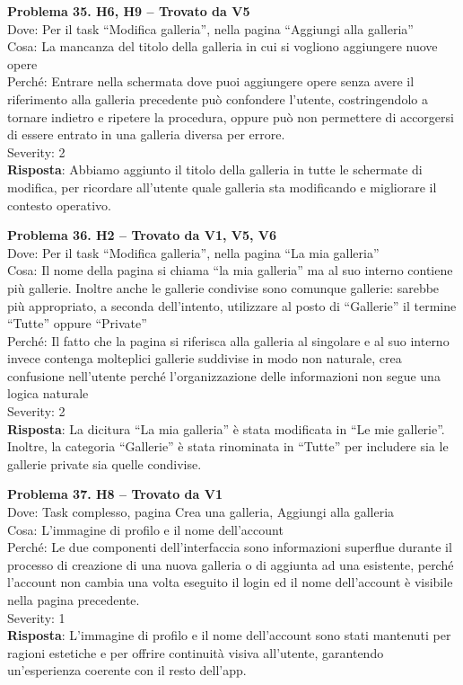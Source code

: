 \documentclass{article}
\begin{document}
\noindent \textbf{Problema 35. H6, H9 – Trovato da V5} \\
Dove: Per il task “Modifica galleria”, nella pagina “Aggiungi alla galleria” \\
Cosa: La mancanza del titolo della galleria in cui si vogliono aggiungere nuove opere \\
Perché: Entrare nella schermata dove puoi aggiungere opere senza avere il riferimento alla galleria precedente può confondere l’utente, costringendolo a tornare indietro e ripetere la procedura, oppure può non permettere di accorgersi di essere entrato in una galleria diversa per errore. \\
Severity: 2 \\
\textbf{Risposta}: Abbiamo aggiunto il titolo della galleria in tutte le schermate di modifica, per ricordare all’utente quale galleria sta modificando e migliorare il contesto operativo.

\noindent \textbf{Problema 36. H2 – Trovato da V1, V5, V6} \\
Dove: Per il task “Modifica galleria”, nella pagina “La mia galleria” \\
Cosa: Il nome della pagina si chiama “la mia galleria” ma al suo interno contiene più gallerie. Inoltre anche le gallerie condivise sono comunque gallerie: sarebbe più appropriato, a seconda dell’intento, utilizzare al posto di “Gallerie” il termine “Tutte” oppure “Private” \\
Perché: Il fatto che la pagina si riferisca alla galleria al singolare e al suo interno invece contenga molteplici gallerie suddivise in modo non naturale, crea confusione nell’utente perché l’organizzazione delle informazioni non segue una logica naturale \\
Severity: 2 \\
\textbf{Risposta}: La dicitura “La mia galleria” è stata modificata in “Le mie gallerie”. Inoltre, la categoria “Gallerie” è stata rinominata in “Tutte” per includere sia le gallerie private sia quelle condivise.

\noindent \textbf{Problema 37. H8 – Trovato da V1} \\
Dove: Task complesso, pagina Crea una galleria, Aggiungi alla galleria \\
Cosa: L’immagine di profilo e il nome dell’account \\
Perché: Le due componenti dell’interfaccia sono informazioni superflue durante il processo di creazione di una nuova galleria o di aggiunta ad una esistente, perché l’account non cambia una volta eseguito il login ed il nome dell'account è visibile nella pagina precedente. \\
Severity: 1 \\
\textbf{Risposta}: L’immagine di profilo e il nome dell’account sono stati mantenuti per ragioni estetiche e per offrire continuità visiva all’utente, garantendo un’esperienza coerente con il resto dell’app.
\end{document}
